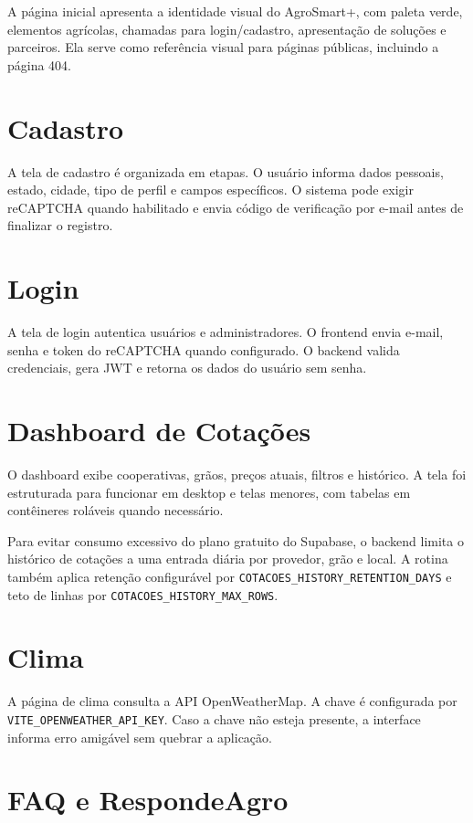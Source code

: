 \documentclass[
  12pt,
  oneside,
  a4paper,
  brazil
]{abntex2}
\begin{document}
A página inicial apresenta a identidade visual do AgroSmart+, com paleta verde, elementos agrícolas, chamadas para login/cadastro, apresentação de soluções e parceiros. Ela serve como referência visual para páginas públicas, incluindo a página 404.

\section{Cadastro}

A tela de cadastro é organizada em etapas. O usuário informa dados pessoais, estado, cidade, tipo de perfil e campos específicos. O sistema pode exigir reCAPTCHA quando habilitado e envia código de verificação por e-mail antes de finalizar o registro.

\section{Login}

A tela de login autentica usuários e administradores. O frontend envia e-mail, senha e token do reCAPTCHA quando configurado. O backend valida credenciais, gera JWT e retorna os dados do usuário sem senha.

\section{Dashboard de Cotações}

O dashboard exibe cooperativas, grãos, preços atuais, filtros e histórico. A tela foi estruturada para funcionar em desktop e telas menores, com tabelas em contêineres roláveis quando necessário.

Para evitar consumo excessivo do plano gratuito do Supabase, o backend limita o histórico de cotações a uma entrada diária por provedor, grão e local. A rotina também aplica retenção configurável por \texttt{COTACOES\_HISTORY\_RETENTION\_DAYS} e teto de linhas por \texttt{COTACOES\_HISTORY\_MAX\_ROWS}.

\section{Clima}

A página de clima consulta a API OpenWeatherMap. A chave é configurada por \texttt{VITE\_OPENWEATHER\_API\_KEY}. Caso a chave não esteja presente, a interface informa erro amigável sem quebrar a aplicação.

\section{FAQ e RespondeAgro}
\end{document}

